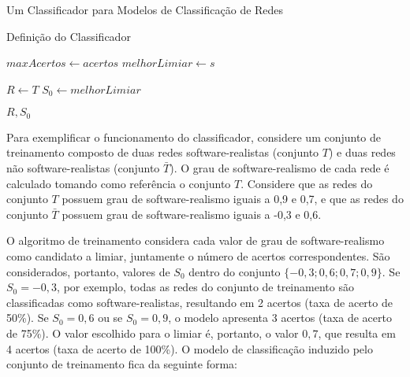 \begin{section}{Um Classificador para Modelos de Classificação de Redes}
\begin{subsection}{Definição do Classificador}
\begin{algorithm}
\begin{algorithmic}
		\STATE $maxAcertos \gets acertos$
		\STATE $melhorLimiar \gets s$
	\ENDIF
\ENDFOR

\STATE $R \gets T$
\STATE $S_0 \gets melhorLimiar$

\RETURN $R, S_0$
\end{algorithmic}	
\end{algorithm}

	 
	
Para exemplificar o funcionamento do classificador, considere um conjunto de treinamento composto de duas redes software-realistas (conjunto $T$) e duas redes não software-realistas (conjunto $\bar{T}$). O grau de software-realismo de cada rede é calculado tomando como referência o conjunto $T$. Considere que as redes do conjunto $T$ possuem grau de software-realismo iguais a 0,9 e 0,7, e que as redes do conjunto $\bar{T}$ possuem grau de software-realismo iguais a -0,3 e 0,6.

O algoritmo de treinamento considera cada valor de grau de software-realismo como candidato a limiar, juntamente o número de acertos correspondentes. São considerados, portanto, valores de $S_0$ dentro do conjunto $\{-0,3; 0,6; 0,7; 0,9\}$. Se $S_0 = -0,3$, por exemplo, todas as redes do conjunto de treinamento são classificadas como software-realistas, resultando em 2 acertos (taxa de acerto de 50\%). Se $S_0 = 0,6$ ou se $S_0 = 0,9$, o modelo apresenta 3 acertos (taxa de acerto de 75\%). O valor escolhido para o limiar é, portanto, o valor $0,7$, que resulta em 4 acertos (taxa de acerto de 100\%). O modelo de classificação induzido pelo conjunto de treinamento fica da seguinte forma:


\end{subsection}
\end{section}
